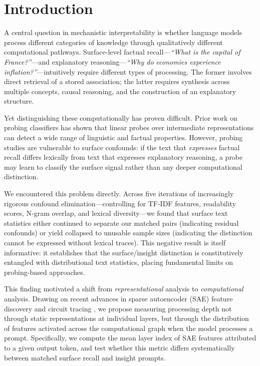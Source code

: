 \documentclass[10pt]{article}
\begin{document}
\section{Introduction}

A central question in mechanistic interpretability is whether language models process different categories of knowledge through qualitatively different computational pathways. Surface-level factual recall---\textit{``What is the capital of France?''}---and explanatory reasoning---\textit{``Why do economies experience inflation?''}---intuitively require different types of processing. The former involves direct retrieval of a stored association; the latter requires synthesis across multiple concepts, causal reasoning, and the construction of an explanatory structure.

Yet distinguishing these computationally has proven difficult. Prior work on probing classifiers \citep{belinkov2022probing} has shown that linear probes over intermediate representations can detect a wide range of linguistic and factual properties. However, probing studies are vulnerable to surface confounds: if the text that \textit{expresses} factual recall differs lexically from text that expresses explanatory reasoning, a probe may learn to classify the surface signal rather than any deeper computational distinction.

We encountered this problem directly. Across five iterations of increasingly rigorous confound elimination---controlling for TF-IDF features, readability scores, N-gram overlap, and lexical diversity---we found that surface text statistics either continued to separate our matched pairs (indicating residual confounds) or yield collapsed to unusable sample sizes (indicating the distinction cannot be expressed without lexical traces). This negative result is itself informative: it establishes that the surface/insight distinction is constitutively entangled with distributional text statistics, placing fundamental limits on probing-based approaches.

This finding motivated a shift from \textit{representational} analysis to \textit{computational} analysis. Drawing on recent advances in sparse autoencoder (SAE) feature discovery \citep{cunningham2023sparse, bricken2023monosemanticity} and circuit tracing \citep{anthropic2025biology}, we propose measuring processing depth not through static representations at individual layers, but through the distribution of features activated across the computational graph when the model processes a prompt. Specifically, we compute the mean layer index of SAE features attributed to a given output token, and test whether this metric differs systematically between matched surface recall and insight prompts.
\end{document}
